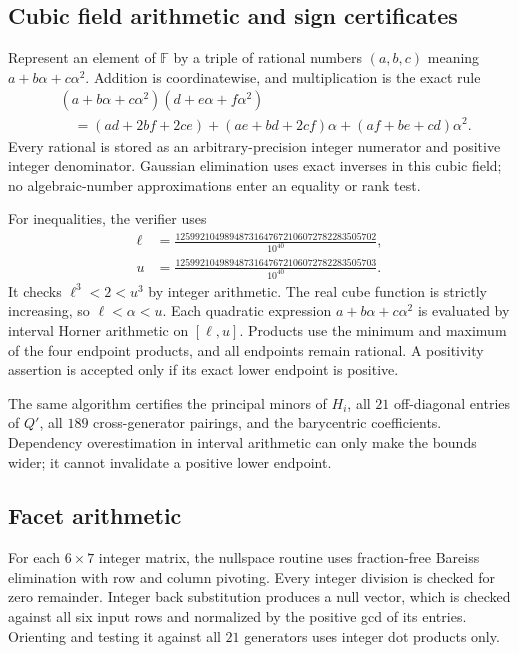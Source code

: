 \documentclass[11pt]{article}
\theoremstyle{definition}
\newcommand{\F}{\mathbb F}
\numberwithin{equation}{section}
\begin{document}
\subsection{Cubic field arithmetic and sign certificates}
Represent an element of $\F$ by a triple of rational numbers
$(a,b,c)$ meaning $a+b\alpha+c\alpha^2$. Addition is coordinatewise,
and multiplication is the exact rule
\begin{align}\label{eq:fieldmultiply}
 &(a+b\alpha+c\alpha^2)(d+e\alpha+f\alpha^2)\nonumber\\
 &\quad=(ad+2bf+2ce)+(ae+bd+2cf)\alpha+(af+be+cd)\alpha^2.
\end{align}
Every rational is stored as an arbitrary-precision integer numerator and
positive integer denominator. Gaussian elimination uses exact inverses
in this cubic field; no algebraic-number approximations enter an equality
or rank test.

For inequalities, the verifier uses
\begin{equation}\label{eq:isolation}
 \begin{aligned}
 \ell&=\frac{12599210498948731647672106072782283505702}{10^{40}},\\[0.4em]
 u&=\frac{12599210498948731647672106072782283505703}{10^{40}}.
 \end{aligned}
\end{equation}
It checks $\ell^3<2<u^3$ by integer arithmetic. The real cube function is
strictly increasing, so $\ell<\alpha<u$. Each quadratic expression
$a+b\alpha+c\alpha^2$ is evaluated by interval Horner arithmetic on
$[\ell,u]$. Products use the minimum and maximum of the four endpoint
products, and all endpoints remain rational. A positivity assertion is
accepted only if its exact lower endpoint is positive.

The same algorithm certifies the principal minors of $H_i$, all $21$
off-diagonal entries of $Q'$, all $189$ cross-generator pairings, and the
barycentric coefficients. Dependency overestimation in interval
arithmetic can only make the bounds wider; it cannot invalidate a
positive lower endpoint.

\subsection{Facet arithmetic}
For each $6\times7$ integer matrix, the nullspace routine uses
fraction-free Bareiss elimination with row and column pivoting. Every
integer division is checked for zero remainder. Integer back substitution
produces a null vector, which is checked against all six input rows and
normalized by the positive gcd of its entries. Orienting and testing it
against all $21$ generators uses integer dot products only.
\end{document}

